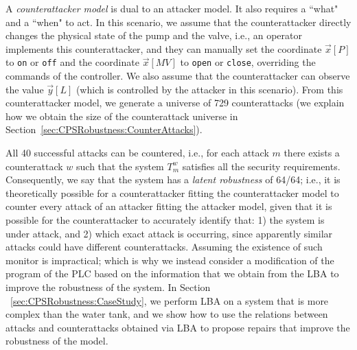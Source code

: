 A \emph{counterattacker model} is dual to an attacker model. It also requires a ``what" and a ``when" to act. In this scenario, we assume that the counterattacker directly changes the physical state of the pump and the valve, i.e., an operator implements this counterattacker, and they can manually set the coordinate $\vec{x}[P]$ to \texttt{on} or \texttt{off} and the coordinate $\vec{x}[MV]$ to \texttt{open} or \texttt{close}, overriding the commands of the controller. We also assume that the counterattacker can observe the value $\vec{y}[L]$ (which is controlled by the attacker in this scenario). From this counterattacker model, we generate a universe of 729 counterattacks (we explain how we obtain the size of the counterattack universe in Section~\ref{sec:CPSRobustness:CounterAttacks}).  

All 40 successful attacks can be countered, i.e., for each attack $m$ there exists a counterattack $w$ such that the system $T^w_m$ satisfies all the security requirements. Consequently, we say that the system has a \emph{latent robustness} of 64/64; i.e., it is theoretically possible for a counterattacker fitting the counterattacker model to counter every attack of an attacker fitting the attacker model, given that it is possible for the counterattacker to accurately identify that: 1) the system is under attack, and 2) which exact attack is occurring, since apparently similar attacks could have different counterattacks. Assuming the existence of such monitor is impractical; which is why we instead consider a modification of the program of the PLC based on the information that we obtain from the LBA to improve the robustness of the system. In Section ~\ref{sec:CPSRobustness:CaseStudy}, we perform LBA on a system that is more complex than the water tank, and we show how to use the relations between attacks and counterattacks obtained via LBA to propose repairs that improve the robustness of the model.  

